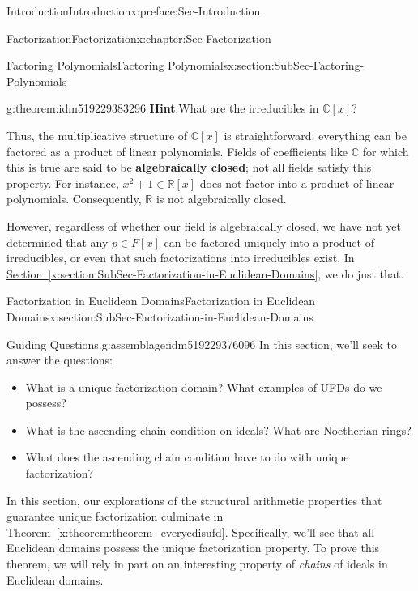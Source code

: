 \documentclass[oneside,10pt,]{book}
\newcommand{\blocktitlefont}{\relax}
\newcommand{\xreffont}{\relax}
\newcommand{\terminology}[1]{\textbf{#1}}
\numberwithin{equation}{section}
\def\C{{\mathbb C}}
\def\R{{\mathbb R}}
\begin{document}
\begin{preface}{Introduction}{}{Introduction}{}{}{x:preface:Sec-Introduction}
\begin{chapterptx}{Factorization}{}{Factorization}{}{}{x:chapter:Sec-Factorization}
\begin{sectionptx}{Factoring Polynomials}{}{Factoring Polynomials}{}{}{x:section:SubSec-Factoring-Polynomials}
\begin{theorem}{}{}{g:theorem:idm519229383296}
\textbf{\blocktitlefont Hint}.\quad{}What are the irreducibles in \(\C[x]\)?%
\end{theorem}
Thus, the multiplicative structure of \(\C[x]\) is straightforward: everything can be factored as a product of linear polynomials. Fields of coefficients like \(\C\) for which this is true are said to be \terminology{algebraically closed}; not all fields satisfy this property. For instance, \(x^2 + 1\in \R[x]\) does not factor into a product of linear polynomials. Consequently, \(\R\) is not algebraically closed.%
\par
However, regardless of whether our field is algebraically closed, we have not yet determined that any \(p\in F[x]\) can be factored uniquely into a product of irreducibles, or even that such factorizations into irreducibles exist. In \hyperref[x:section:SubSec-Factorization-in-Euclidean-Domains]{Section~{\xreffont\ref{x:section:SubSec-Factorization-in-Euclidean-Domains}}}, we do just that.%
\end{sectionptx}
%
%
\typeout{************************************************}
\typeout{************************************************}
%
\begin{sectionptx}{Factorization in Euclidean Domains}{}{Factorization in Euclidean Domains}{}{}{x:section:SubSec-Factorization-in-Euclidean-Domains}
\begin{assemblage}{Guiding Questions.}{g:assemblage:idm519229376096}%
In this section, we'll seek to answer the questions: %
\begin{itemize}[label=\textbullet]
\item{}What is a unique factorization domain? What examples of UFDs do we possess?%
\item{}What is the ascending chain condition on ideals? What are Noetherian rings?%
\item{}What does the ascending chain condition have to do with unique factorization?%
\end{itemize}
%
\end{assemblage}
\begin{introduction}{}%
In this section, our explorations of the structural arithmetic properties that guarantee unique factorization culminate in \hyperref[x:theorem:theorem_everyedisufd]{Theorem~{\xreffont\ref{x:theorem:theorem_everyedisufd}}}. Specifically, we'll see that all Euclidean domains possess the unique factorization property. To prove this theorem, we will rely in part on an interesting property of \emph{chains} of ideals in Euclidean domains.%

\end{introduction}
\end{sectionptx}
\end{chapterptx}
\end{preface}
\end{document}
